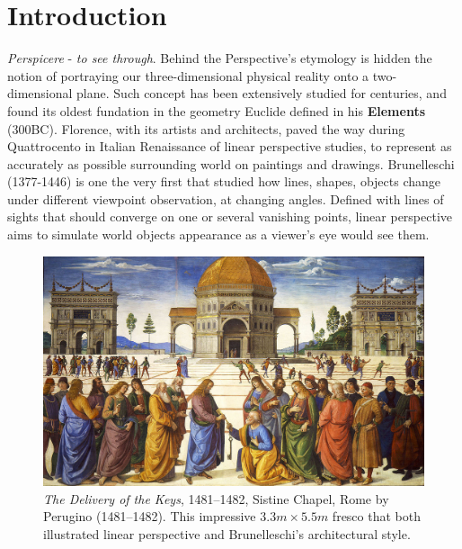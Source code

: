 \chapter{Introduction}
\label{chapter:introduction}



\emph{Perspicere} - \textit{to see through}. Behind the Perspective's etymology is hidden the notion of portraying our three-dimensional physical reality onto a two-dimensional plane. Such concept has been extensively studied for centuries, and found its oldest fundation in the geometry Euclide defined in his \textbf{Elements} (300BC). Florence, with its artists and architects, paved the way during Quattrocento in Italian Renaissance of linear perspective studies, to represent as accurately as possible surrounding world on paintings and drawings. Brunelleschi (1377-1446) is one the very first that studied how lines, shapes, objects change under different viewpoint observation, at changing angles. Defined with lines of sights that should converge on one or several vanishing points, linear perspective aims to simulate world objects appearance as a viewer's eye would see them.

\begin{figure}[h!]
      \begin{center}
      \includegraphics[width=.8\textwidth]{images/introduction/perugino.jpg}
      \end{center}
      \caption{\textit{The Delivery of the Keys}, 1481–1482, Sistine Chapel, Rome by Perugino (1481–1482). This impressive $3.3m \times 5.5m$ fresco that both illustrated linear perspective and Brunelleschi's architectural style.}
      \label{fig:intro_perugino}
\end{figure}

